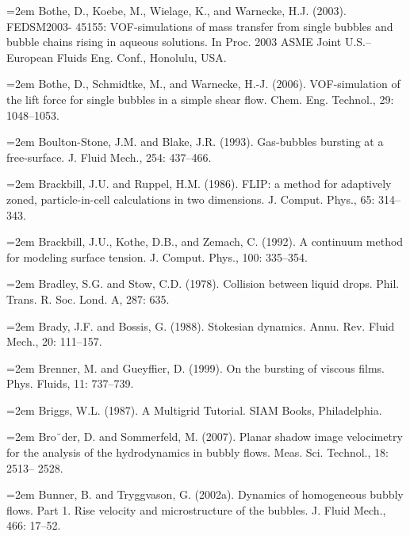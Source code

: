 \documentclass[11pt,a4paper,openany,fontset=none]{ctexbook}
\begin{document}
\par\hangindent=2em Bothe, D., Koebe, M., Wielage, K., and Warnecke, H.J. (2003). FEDSM2003- 45155: VOF-simulations of mass transfer from single bubbles and bubble chains rising in aqueous solutions. In Proc. 2003 ASME Joint U.S.--European Fluids Eng. Conf., Honolulu, USA.


\par\hangindent=2em Bothe, D., Schmidtke, M., and Warnecke, H.-J. (2006). VOF-simulation of the lift force for single bubbles in a simple shear flow. Chem. Eng. Technol., 29: 1048--1053.

\par\hangindent=2em Boulton-Stone, J.M. and Blake, J.R. (1993). Gas-bubbles bursting at a free-surface. J. Fluid Mech., 254: 437--466.

\par\hangindent=2em Brackbill, J.U. and Ruppel, H.M. (1986). FLIP: a method for adaptively zoned, particle-in-cell calculations in two dimensions. J. Comput. Phys., 65: 314--343.

\par\hangindent=2em Brackbill, J.U., Kothe, D.B., and Zemach, C. (1992). A continuum method for modeling surface tension. J. Comput. Phys., 100: 335--354.

\par\hangindent=2em Bradley, S.G. and Stow, C.D. (1978). Collision between liquid drops. Phil. Trans. R. Soc. Lond. A, 287: 635.

\par\hangindent=2em Brady, J.F. and Bossis, G. (1988). Stokesian dynamics. Annu. Rev. Fluid Mech., 20: 111--157.

\par\hangindent=2em Brenner, M. and Gueyffier, D. (1999). On the bursting of viscous films. Phys. Fluids, 11: 737--739.

\par\hangindent=2em Briggs, W.L. (1987). A Multigrid Tutorial. SIAM Books, Philadelphia.

\par\hangindent=2em Bro¨der, D. and Sommerfeld, M. (2007). Planar shadow image velocimetry for the analysis of the hydrodynamics in bubbly flows. Meas. Sci. Technol., 18: 2513-- 2528.

\par\hangindent=2em Bunner, B. and Tryggvason, G. (2002a). Dynamics of homogeneous bubbly flows. Part 1. Rise velocity and microstructure of the bubbles. J. Fluid Mech., 466: 17--52.
\end{document}
